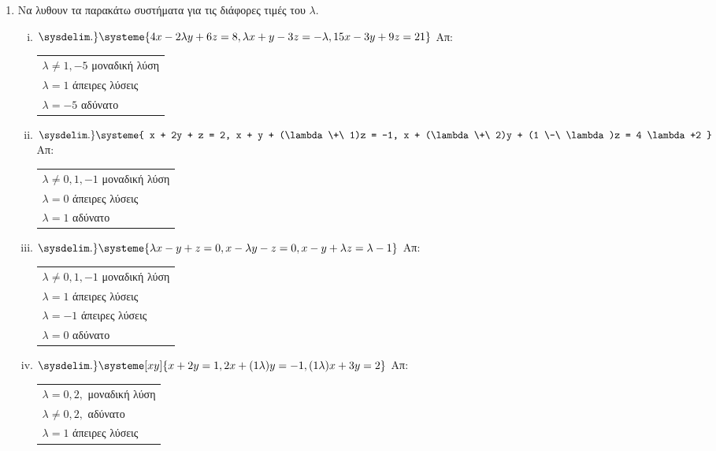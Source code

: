 \begin{enumerate}
\begin{enumerate}[i)]
 \end{enumerate}

\item Να λυθουν τα παρακάτω συστήματα για τις διάφορες τιμές του $ \lambda $.

  \begin{enumerate}[i)]
    \setlength{\itemsep}{\baselineskip}
\item $\sysdelim.\} \systeme{4x-2\lambda y + 6z = 8, \lambda x + y -3z = -\lambda, 15x -3y + 9z = 21}$ \hfill Απ: \begin{tabular}{l}
    $\lambda \neq 1,-5 $ μοναδική λύση \\
    $\lambda = 1 $ άπειρες λύσεις \\
    $\lambda =-5 $ αδύνατο
  \end{tabular}


\item $ \sysdelim.\} \systeme{
  x + 2y + z = 2, 
  x + y + (\lambda  \+\ 1)z = -1, 
  x + (\lambda  \+\ 2)y + (1 \-\ \lambda)z = 4 \lambda +2
} $ \hfill Απ: \begin{tabular}{l}
  $ \lambda \neq 0, 1, -1 $ μοναδική λύση \\
  $ \lambda = 0 $ άπειρες λύσεις \\
  $ \lambda = 1 $ αδύνατο 
\end{tabular} 

\item $ \sysdelim.\} \systeme{
  \lambda x - y + z = 0,
  x - \lambda y - z = 0, 
  x - y + \lambda z = \lambda - 1
} $ \hfill Απ: \begin{tabular}{l}
  $ \lambda \neq 0, 1, -1 $ μοναδική λύση \\
  $ \lambda = 1$ άπειρες λύσεις \\
  $ \lambda = -1 $ άπειρες λύσεις \\
  $ \lambda = 0 $ αδύνατο
\end{tabular} 

\item $ \sysdelim.\} \systeme[xy]{
  x + 2y = 1,
  2x+(1 \- \lambda)y = -1, 
  (1 \- \lambda)x + 3y = 2
} $ \hfill Απ: \begin{tabular}{l}
  $ \lambda = 0, 2, $ μοναδική λύση \\
  $ \lambda \neq 0, 2, $ αδύνατο \\
  $ \lambda = 1$ άπειρες λύσεις \\
\end{tabular} 



  \end{enumerate}

\end{enumerate}


